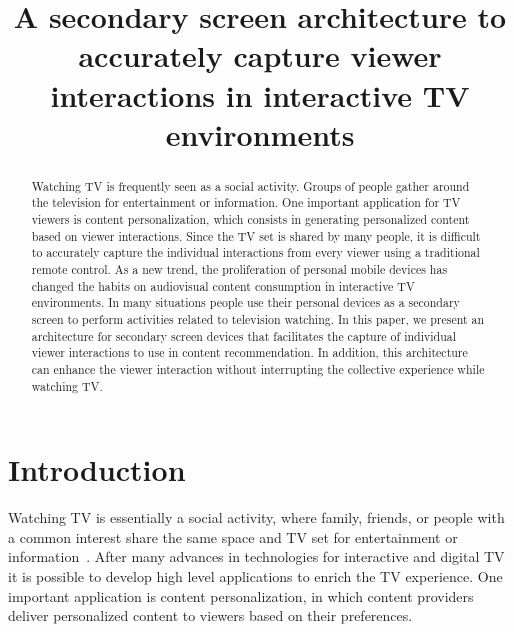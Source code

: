 \documentclass[conference,a4paper]{IEEEtran}
\begin{document}
\title{A secondary screen architecture to accurately capture viewer interactions in interactive TV environments}

\author{
\and
{}
}
\maketitle

\begin{abstract}
Watching TV is frequently seen as a social activity. Groups of people gather around the television for entertainment or information. One important application for TV viewers is content personalization, which consists in generating personalized content based on viewer interactions. Since the TV set is shared by many people, it is difficult to accurately capture the individual interactions from every viewer using a traditional remote control. As a new trend, the proliferation of personal mobile devices has changed the habits on audiovisual content consumption in interactive TV environments. In many situations people use their personal devices as a secondary screen to perform activities related to television watching. In this paper, we present an architecture for secondary screen devices that facilitates the capture of individual viewer interactions to use in content recommendation. In addition, this architecture can enhance the viewer interaction without interrupting the collective experience while watching TV.
\end{abstract}

\IEEEpeerreviewmaketitle

\section{Introduction}

Watching TV is essentially a social activity, where family, friends, or people with a common interest share the same space and TV set for entertainment or information~\cite{Masthoff2004}. After many advances in technologies for interactive and digital TV it is possible to develop high level applications to enrich the TV experience. One important application is content personalization, in which content providers deliver personalized content to viewers based on their preferences.
\end{document}
